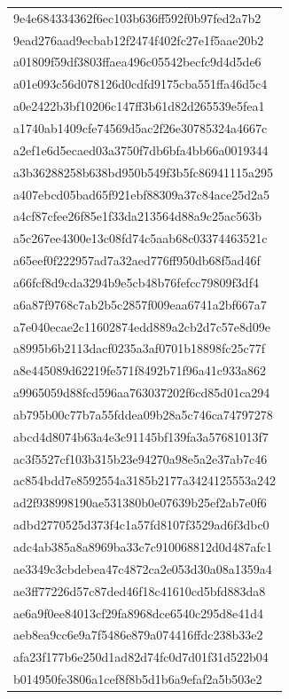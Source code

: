\begin{tabular}{l}
9e4e684334362f6ec103b636ff592f0b97fed2a7b2 \\
9ead276aad9ecbab12f2474f402fc27e1f5aae20b2 \\
a01809f59df3803ffaea496c05542becfc9d4d5de6 \\
a01e093c56d078126d0cdfd9175cba551ffa46d5c4 \\
a0e2422b3bf10206c147ff3b61d82d265539e5fea1 \\
a1740ab1409cfe74569d5ac2f26e30785324a4667c \\
a2ef1e6d5ecaed03a3750f7db6bfa4bb66a0019344 \\
a3b36288258b638bd950b549f3b5fc86941115a295 \\
a407ebcd05bad65f921ebf88309a37c84ace25d2a5 \\
a4cf87cfee26f85e1f33da213564d88a9c25ac563b \\
a5c267ee4300e13c08fd74c5aab68c03374463521c \\
a65eef0f222957ad7a32aed776ff950db68f5ad46f \\
a66fcf8d9cda3294b9e5cb48b76fefcc79809f3df4 \\
a6a87f9768c7ab2b5c2857f009eaa6741a2bf667a7 \\
a7e040ecae2c11602874edd889a2cb2d7c57e8d09e \\
a8995b6b2113dacf0235a3af0701b18898fc25c77f \\
a8e445089d62219fe571f8492b71f96a41c933a862 \\
a9965059d88fcd596aa763037202f6cd85d01ca294 \\
ab795b00c77b7a55fddea09b28a5c746ca74797278 \\
abcd4d8074b63a4e3c91145bf139fa3a57681013f7 \\
ac3f5527cf103b315b23e94270a98e5a2e37ab7c46 \\
ac854bdd7e8592554a3185b2177a3424125553a242 \\
ad2f938998190ae531380b0e07639b25ef2ab7e0f6 \\
adbd2770525d373f4c1a57fd8107f3529ad6f3dbc0 \\
adc4ab385a8a8969ba33c7c910068812d0d487afc1 \\
ae3349c3cbdebea47c4872ca2e053d30a08a1359a4 \\
ae3ff77226d57c87ded46f18c41610cd5bfd883da8 \\
ae6a9f0ee84013cf29fa8968dce6540c295d8e41d4 \\
aeb8ea9cc6e9a7f5486e879a074416ffdc238b33e2 \\
afa23f177b6e250d1ad82d74fc0d7d01f31d522b04 \\
b014950fe3806a1cef8f8b5d1b6a9efaf2a5b503e2 \\

\end{tabular}
